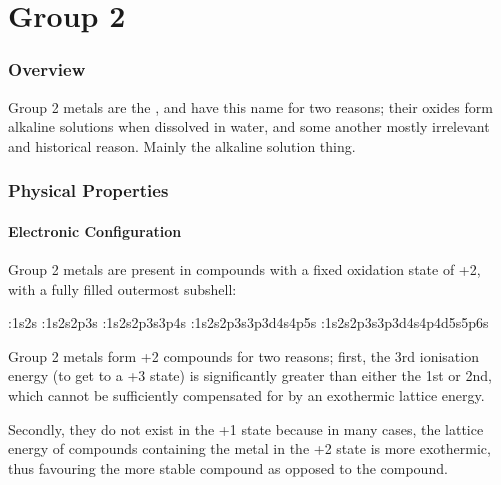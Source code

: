 

\pagebreak
\part{Group 2}

	\section{Overview}

		Group 2 metals are the , and have this name for two reasons; their oxides form alkaline solutions
		when dissolved in water, and some another mostly irrelevant and historical reason. Mainly the alkaline solution thing.


	\section{Physical Properties}

		\subsection{Electronic Configuration}

			Group 2 metals are present in compounds with a fixed oxidation state of +2, with a fully filled outermost  subshell:

			\tabto{0mm}:\tabto{10mm}1s\sps{2}2s
			\tabto{0mm}:\tabto{10mm}1s2s2p3s
			\tabto{0mm}:\tabto{10mm}1s\sps{2}2s2p3s3p4s
			\tabto{0mm}:\tabto{10mm}1s\sps{2}2s2p3s3p3d4s4p5s
			\tabto{0mm}:\tabto{10mm}1s\sps{2}2s2p3s3p3d4s4p4d5s5p6s


			Group 2 metals form +2 compounds for two reasons; first, the 3rd ionisation energy (to get to a +3 state) is significantly greater
			than either the 1st or 2nd, which cannot be sufficiently compensated for by an exothermic lattice energy.

			Secondly, they do not exist in the +1 state because in many cases, the lattice energy of compounds containing the metal in the +2
			state is more exothermic, thus favouring the more stable  compound as opposed to the  compound.

